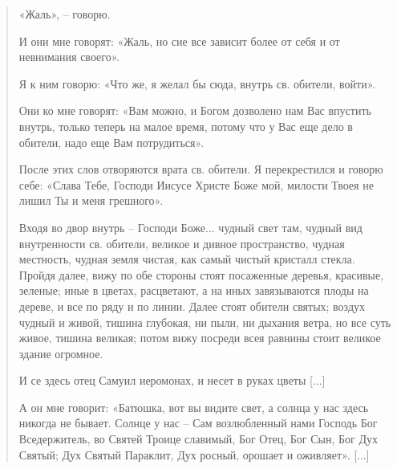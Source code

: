\begin{quotation}
«Жаль», – говорю.

И они мне говорят: «Жаль, но сие все зависит более от себя и от невнимания своего».

Я к ним говорю: «Что же, я желал бы сюда, внутрь св. обители, войти».

Они ко мне говорят: «Вам можно, и Богом дозволено нам Вас впустить внутрь, только теперь на малое время, потому что у Вас еще дело в обители, надо еще Вам потрудиться».

После этих слов отворяются врата св. обители. Я перекрестился и говорю себе: «Слава Тебе, Господи Иисусе Христе Боже мой, милости Твоея не лишил Ты и меня грешного».

Входя во двор внутрь – Господи Боже... чудный свет там, чудный вид внутренности св. обители, великое и дивное пространство, чудная местность, чудная земля чистая, как самый чистый кристалл стекла. Пройдя далее, вижу по обе стороны стоят посаженные  деревья, красивые, зеленые; иные в цветах, расцветают, а на иных завязываются  плоды на дереве, и все по ряду и по линии. Далее стоят обители святых; воздух чудный и живой, тишина глубокая, ни пыли, ни дыхания ветра, но все суть живое, тишина великая; потом вижу посреди всея равнины стоит великое здание огромное. 

И се здесь отец Самуил иеромонах, и несет в руках цветы [...]



А он мне говорит: «Батюшка, вот вы видите свет, а солнца у нас здесь никогда не бывает. Солнце у нас – Сам возлюбленный нами Господь Бог Вседержитель, во Святей Троице славимый, Бог Отец, Бог Сын, Бог Дух Святый; Дух Святый Параклит, Дух росный, орошает и оживляет». [...]



\end{quotation}
